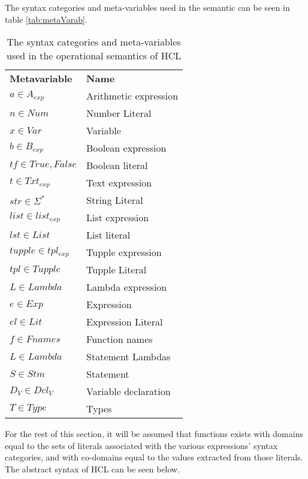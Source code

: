 The syntax categories and meta-variables used in the semantic can be seen in table \ref{tab:metaVarab}. 
\begin{center}
	\begin{table}[ht]
		\centering
		\caption{The syntax categories and meta-variables used in the operational semantics of HCL}
		\label{tab:metaVar}
		\begin{tabular}{ll}
			\textbf{Metavariable} & \textbf{Name} \\
			$a \in A_{exp}$ 	  & Arithmetic expression \\
			$n \in Num$			  & Number Literal \\
			$x \in Var$           & Variable \\
			$b \in B_{exp}$		  & Boolean expression\\ 
			$tf \in {True,False}$ & Boolean literal \\
			$t \in Txt_{exp}$     & Text expression\\
			$str \in {\Sigma^*}$  & String Literal \\
			$list \in list_{exp}$ & List expression \\
			$lst \in List$		  & List literal\\
			$tupple \in tpl_{exp}$& Tupple expression\\
			$tpl \in Tupple$	  & Tupple Literal\\
			$L \in Lambda$		  & Lambda expression\\
			$e \in Exp$			  & Expression\\
			$el \in Lit$		  & Expression Literal\\
			
			$f \in Fnames$        & Function names\\
			$L \in Lambda$        & Statement Lambdas\\
			$S \in Stm$           & Statement\\
			
			$D_V \in Dcl_V$		  & Variable declaration \\
			
			$T \in Type$          & Types \\
		\end{tabular}
	\end{table}
\end{center}

For the rest of this section, it will be assumed that functions exists with domains equal to the sets of literals associated with the various expressions' syntax categories, and with co-domains equal to the values extracted from those literals.
The abstract syntax of HCL can be seen below.

